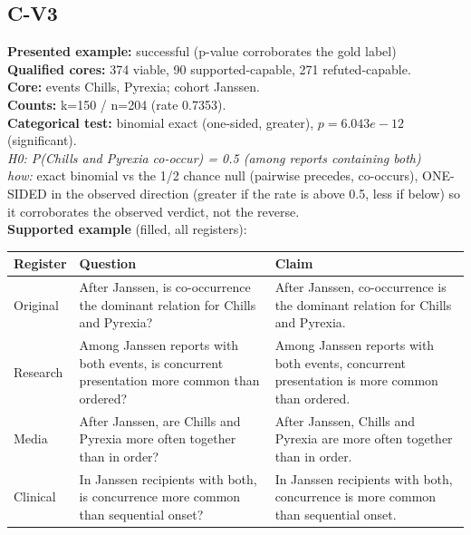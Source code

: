 \documentclass[11pt]{article}
\begin{document}
\subsection*{C-V3}
\textbf{Presented example:} successful (p-value corroborates the gold label) \\
\textbf{Qualified cores:} 374 viable, 90 supported-capable, 271 refuted-capable. \\
\textbf{Core:} events Chills, Pyrexia; cohort Janssen. \\
\textbf{Counts:} k=150 / n=204  (rate 0.7353). \\
\textbf{Categorical test:} binomial exact (one-sided, greater), $p = 6.043e-12$ (significant). \\
\emph{H0: P(Chills and Pyrexia co-occur) = 0.5 (among reports containing both)} \\
\emph{how:} exact binomial vs the 1/2 chance null (pairwise precedes, co-occurs), ONE-SIDED in the observed direction (greater if the rate is above 0.5, less if below) so it corroborates the observed verdict, not the reverse. \\
\textbf{Supported example} (filled, all registers): \\
\begin{tabularx}{\linewidth}{@{}l L L@{}}
\toprule
\textbf{Register} & \textbf{Question} & \textbf{Claim} \\
\midrule
Original & After Janssen, is co-occurrence the dominant relation for Chills and Pyrexia? & After Janssen, co-occurrence is the dominant relation for Chills and Pyrexia. \\
Research & Among Janssen reports with both events, is concurrent presentation more common than ordered? & Among Janssen reports with both events, concurrent presentation is more common than ordered. \\
Media & After Janssen, are Chills and Pyrexia more often together than in order? & After Janssen, Chills and Pyrexia are more often together than in order. \\
Clinical & In Janssen recipients with both, is concurrence more common than sequential onset? & In Janssen recipients with both, concurrence is more common than sequential onset. \\
\bottomrule
\end{tabularx}
\vspace{3pt}
\end{document}
